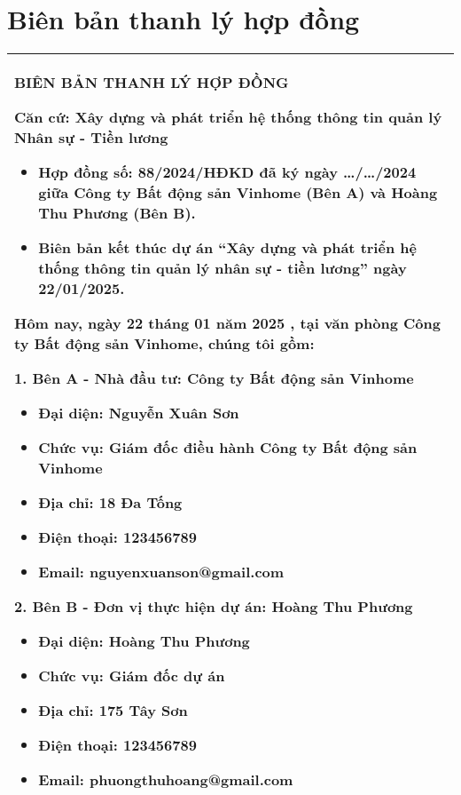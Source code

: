 \section{Biên bản thanh lý hợp đồng}
\begin{longtable}{|p{\textwidth}|}
    \hline
    \begin{minipage}{\textwidth}
        \begin{center}
            \Large\textbf{BIÊN BẢN THANH LÝ HỢP ĐỒNG}
        \end{center}
        \vspace{0.2cm}
        \noindent\textbf{Căn cứ:} Xây dựng và phát triển hệ thống thông tin quản lý Nhân sự - Tiền lương

        \begin{itemize}
            \item Hợp đồng số: 88/2024/HĐKD đã ký ngày …/…/2024 giữa Công ty Bất động sản Vinhome (Bên A) và Hoàng Thu Phương (Bên B).
            \item Biên bản kết thúc dự án “Xây dựng và phát triển hệ thống thông tin quản lý nhân sự - tiền lương” ngày 22/01/2025.
        \end{itemize}

        \noindent\textbf{Hôm nay, ngày 22 tháng 01 năm 2025} , tại văn phòng Công ty Bất động sản Vinhome, chúng tôi gồm:

        \noindent\textbf{1. Bên A - Nhà đầu tư:} Công ty Bất động sản Vinhome
        \begin{itemize}
            \item Đại diện: Nguyễn Xuân Sơn
            \item Chức vụ: Giám đốc điều hành Công ty Bất động sản Vinhome
            \item Địa chỉ: 18 Đa Tống
            \item Điện thoại: 123456789
            \item Email: nguyenxuanson@gmail.com
        \end{itemize}
        \noindent\textbf{2. Bên B - Đơn vị thực hiện dự án:} Hoàng Thu Phương
        \begin{itemize}
            \item Đại diện: Hoàng Thu Phương
            \item Chức vụ: Giám đốc dự án
            \item Địa chỉ: 175 Tây Sơn
            \item Điện thoại: 123456789
            \item Email: phuongthuhoang@gmail.com
        \end{itemize}
    \end{minipage}
    \\ \hline
\end{longtable}
